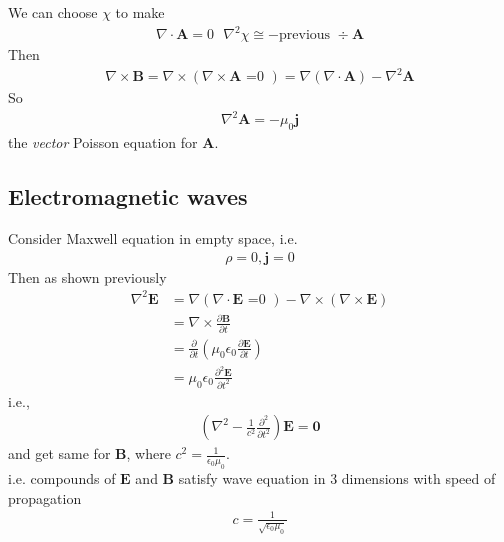 \documentclass[a4paper]{article}
\begin{document}
We can choose $\chi$ to make
\begin{equation*}
\begin{aligned}
\nabla\cdot\mathbf{A} = 0 \text{  } \nabla^2\chi \cong -\text{previous  } \div \mathbf{A}
\end{aligned}
\end{equation*}
Then
\begin{equation*}
\begin{aligned}
\nabla\times\mathbf{B} = \nabla\times\left(\nabla\times\mathbf{A}\text{ =0 }\right) = \nabla\left(\nabla\cdot\mathbf{A}\right)-\nabla^2 \mathbf{A}
\end{aligned}
\end{equation*}
So
\begin{equation*}
\begin{aligned}
\nabla^2 \mathbf{A} = -\mu_0 \mathbf{j}
\end{aligned}
\end{equation*}
the \emph{vector} Poisson equation for $\mathbf{A}$.

\subsection{Electromagnetic waves}
Consider Maxwell equation in empty space, i.e.
\begin{equation*}
\begin{aligned}
\rho = 0, \mathbf{j} = 0
\end{aligned}
\end{equation*}
Then as shown previously
\begin{equation*}
\begin{aligned}
\nabla^2 \mathbf{E} &= \nabla\left(\nabla\cdot\mathbf{E}  \text{ =0 }\right)-\nabla\times\left(\nabla\times\mathbf{E}\right)\\
&= \nabla\times\frac{\partial \mathbf{B}}{\partial t}\\
&= \frac{\partial}{\partial t}\left(\mu_0 \epsilon_0 \frac{\partial \mathbf{E}}{\partial t}\right) \\
&= \mu_0 \epsilon_0 \frac{\partial^2 \mathbf{E}}{\partial t^2}
\end{aligned}
\end{equation*}
i.e.,
\begin{equation*}
\begin{aligned}
\left(\nabla^2 - \frac{1}{c^2}\frac{\partial^2}{\partial t^2}\right) \mathbf{E} = \mathbf{0}
\end{aligned}
\end{equation*}
and get same for $\mathbf{B}$, where $c^2 = \frac{1}{\epsilon_0 \mu_0}$.\\
i.e. compounds of $\mathbf{E}$ and $\mathbf{B}$ satisfy wave equation in 3 dimensions with speed of propagation
\begin{equation*}
\begin{aligned}
c=\frac{1}{\sqrt{\epsilon_0 \mu_0}}
\end{aligned}
\end{equation*}
\end{document}
